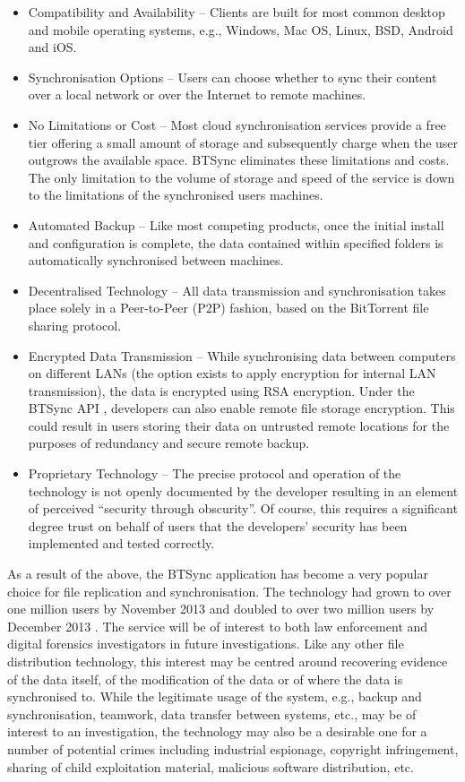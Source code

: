 \documentclass[final,5p,times,twocolumn]{elsarticle}
\begin{document}
\begin{itemize}
\item Compatibility and Availability -- Clients are built for most common desktop and mobile operating systems, e.g., Windows, Mac OS, Linux, BSD, Android and iOS.
\item Synchronisation Options -- Users can choose whether to sync their content over a local network or over the Internet to remote machines.
\item No Limitations or Cost -- Most cloud synchronisation services provide a free tier offering a small amount of storage and subsequently charge when the user outgrows the available space. BTSync eliminates these limitations and costs. The only limitation to the volume of storage and speed of the service is down to the limitations of the synchronised users machines.
\item Automated Backup -- Like most competing products, once the initial install and configuration is complete, the data contained within specified folders is automatically synchronised between machines.
\item Decentralised Technology -- All data transmission and synchronisation takes place solely in a Peer-to-Peer (P2P) fashion, based on the BitTorrent file sharing protocol.
\item Encrypted Data Transmission -- While synchronising data between computers on different LANs (the option exists to apply encryption for internal LAN transmission), the data is encrypted using RSA encryption. Under the BTSync API \cite{bitsyncapi}, developers can also enable remote file storage encryption. This could result in users storing their data on untrusted remote locations for the purposes of redundancy and secure remote backup.
\item Proprietary Technology -- The precise protocol and operation of the technology is not openly documented by the developer resulting in an element of perceived ``security through obscurity''. Of course, this requires a significant degree trust on behalf of users that the developers' security has been implemented and tested correctly.
\end{itemize}

As a result of the above, the BTSync application has become a very popular choice for file replication and synchronisation. The technology had grown to over one million users by November 2013 and doubled to over two million users by December 2013 \cite{bitsyncstats}. The service will be of interest to both law enforcement and digital forensics investigators in future investigations. Like any other file distribution technology, this interest may be centred around recovering evidence of the data itself, of the modification of the data or of where the data is synchronised to. While the legitimate usage of the system, e.g., backup and synchronisation, teamwork, data transfer between systems, etc., may be of interest to an investigation, the technology may also be a desirable one for a number of potential crimes including industrial espionage, copyright infringement, sharing of child exploitation material, malicious software distribution, etc.
\end{document}
